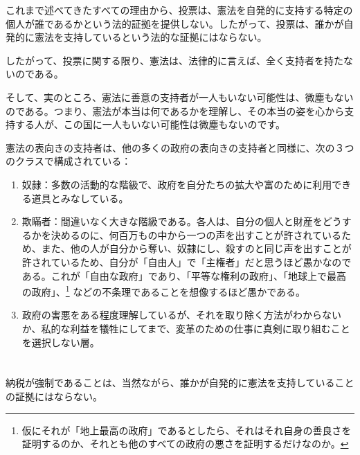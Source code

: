 \documentclass[dvipdfmx, uplatex, tate, landscape]{utbook}
\begin{document}
\noindent
これまで述べてきたすべての理由から、投票は、憲法を自発的に支持する特定の個人が誰であるかという法的証拠を提供しない。したがって、投票は、誰かが自発的に憲法を支持しているという法的な証拠にはならない。

したがって、投票に関する限り、憲法は、法律的に言えば、全く支持者を持たないのである。

そして、実のところ、憲法に善意の支持者が一人もいない可能性は、微塵もないのである。つまり、憲法が本当は何であるかを理解し、その本当の姿を心から支持する人が、この国に一人もいない可能性は微塵もないのです。

憲法の表向きの支持者は、他の多くの政府の表向きの支持者と同様に、次の３つのクラスで構成されている：

\begin{enumerate}

  \item 奴隷：多数の活動的な階級で、政府を自分たちの拡大や富のために利用できる道具とみなしている。
  \item 欺瞞者：間違いなく大きな階級である。各人は、自分の個人と財産をどうするかを決めるのに、何百万もの中から一つの声を出すことが許されているため、また、他の人が自分から奪い、奴隷にし、殺すのと同じ声を出すことが許されているため、自分が「自由人」で「主権者」だと思うほど愚かなのである。これが「自由な政府」であり、「平等な権利の政府」、「地球上で最高の政府」、\footnote{仮にそれが「地上最高の政府」であるとしたら、それはそれ自身の善良さを証明するのか、それとも他のすべての政府の悪さを証明するだけなのか。} などの不条理であることを想像するほど愚かである。
  \item 政府の害悪をある程度理解しているが、それを取り除く方法がわからないか、私的な利益を犠牲にしてまで、変革のための仕事に真剣に取り組むことを選択しない層。
\end{enumerate}
\chapter{}
納税が強制であることは、当然ながら、誰かが自発的に憲法を支持していることの証拠にはならない。
\end{document}

